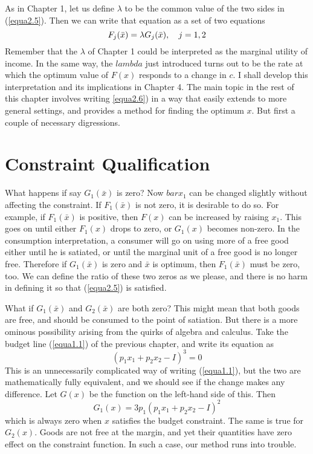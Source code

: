 As in Chapter 1, let us define $\lambda$ to be the common value of the two sides in (\ref{equa2.5}). Then we can write that equation as a set of two equations
\begin{equation}\label{equa2.6}
F_j(\bar{x}) = \lambda G_j(\bar{x}), \mbox{\quad} j=1,2
\end{equation}
Remember that the $\lambda$ of Chapter 1 could be interpreted as the marginal utility of income. In the same way, the $lambda$ just introduced turns out to be the rate at which the optimum value of $F(x)$ responds to a change in $c$. I shall develop this interpretation and its implications in Chapter 4. The main topic in the rest of this chapter involves writing \ref{equa2.6}) in a way that easily extends to more general settings, and provides a method for finding the optimum $x$. But first a couple of necessary digressions.

\section*{Constraint Qualification}

What happens if say $G_1(\bar{x})$ is zero? Now $bar{x}_1$ can be changed slightly without affecting the constraint. If $F_1(\bar{x})$ is not zero, it is desirable to do so. For example, if $F_1(\bar{x})$ is positive, then $F(x)$ can be increased by raising $x_1$. This goes on until either $F_1(x)$ drops to zero, or $G_1(x)$ becomes non-zero. In the consumption interpretation, a consumer will go on using more of a free good either until he is satiated, or until the marginal unit of a free good is no longer free. Therefore if $G_1(\bar{x})$ is zero and $\bar{x}$ is optimum, then $F_1(\bar{x})$ must be zero, too. We can define the ratio of these two zeros as we please, and there is no harm in defining it so that (\ref{equa2.5}) is satisfied.

What if $G_1(\bar{x})$ and $G_2(\bar{x})$ are both zero? This might mean that both goods are free, and should be consumed to the point of satiation. But there is a more ominous possibility arising from the quirks of algebra and calculus. Take the budget line (\ref{equa1.1}) of the previous chapter, and write its equation as
\begin{equation*}
(p_1 x_1 + p_2 x_2 -I)^3 = 0
\end{equation*}
This is an unnecessarily complicated way of writing (\ref{equa1.1}), but the two are mathematically fully equivalent, and we should see if the change makes any difference. Let $G(x)$ be the function on the left-hand side of this. Then
\begin{equation*}
G_1(x) = 3 p_1 (p_1 x_1 + p_2 x_2 -I)^2
\end{equation*}
which is always zero when $x$ satisfies the budget constraint. The same is true for $G_2(x)$. Goods are not free at the margin, and yet their quantities have zero effect on the constraint function. In such a case, our method runs into trouble.

